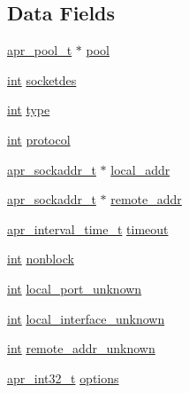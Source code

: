 \subsection*{Data Fields}
\begin{DoxyCompactItemize}
\item 
\hyperlink{structapr__pool__t}{apr\+\_\+pool\+\_\+t} $\ast$ \hyperlink{structapr__socket__t_a122d4e497509ed40dd450119a8aa1cd2}{pool}
\item 
\hyperlink{pcre_8txt_a42dfa4ff673c82d8efe7144098fbc198}{int} \hyperlink{structapr__socket__t_acd1a084790ce6cb462825fc029000095}{socketdes}
\item 
\hyperlink{pcre_8txt_a42dfa4ff673c82d8efe7144098fbc198}{int} \hyperlink{structapr__socket__t_a722ea4796e2227c8b0821d1d75ea0b07}{type}
\item 
\hyperlink{pcre_8txt_a42dfa4ff673c82d8efe7144098fbc198}{int} \hyperlink{structapr__socket__t_a89e0cf9d8e6d443c5d69d7f813ef9df7}{protocol}
\item 
\hyperlink{structapr__sockaddr__t}{apr\+\_\+sockaddr\+\_\+t} $\ast$ \hyperlink{structapr__socket__t_ae310bbeb00298cd45c03dca515289239}{local\+\_\+addr}
\item 
\hyperlink{structapr__sockaddr__t}{apr\+\_\+sockaddr\+\_\+t} $\ast$ \hyperlink{structapr__socket__t_a487dc49f378bdc6ad32d362b9fe575a2}{remote\+\_\+addr}
\item 
\hyperlink{group__apr__time_gaae2129185a395cc393f76fabf4f43e47}{apr\+\_\+interval\+\_\+time\+\_\+t} \hyperlink{structapr__socket__t_a3626689cdb39190d306a43cbd7f9e90c}{timeout}
\item 
\hyperlink{pcre_8txt_a42dfa4ff673c82d8efe7144098fbc198}{int} \hyperlink{structapr__socket__t_a737f257434cad45a1c44ad653f1e5964}{nonblock}
\item 
\hyperlink{pcre_8txt_a42dfa4ff673c82d8efe7144098fbc198}{int} \hyperlink{structapr__socket__t_a26fff6df2c70dd6cfa2514ca233cfbbf}{local\+\_\+port\+\_\+unknown}
\item 
\hyperlink{pcre_8txt_a42dfa4ff673c82d8efe7144098fbc198}{int} \hyperlink{structapr__socket__t_a3e468f713040ca13ba88d659b6e26fb5}{local\+\_\+interface\+\_\+unknown}
\item 
\hyperlink{pcre_8txt_a42dfa4ff673c82d8efe7144098fbc198}{int} \hyperlink{structapr__socket__t_ae9f799c8f438814bfbf0d66265d4ac0d}{remote\+\_\+addr\+\_\+unknown}
\item 
\hyperlink{group__apr__platform_ga21ef1e35fd3ff9be386f3cb20164ff02}{apr\+\_\+int32\+\_\+t} \hyperlink{structapr__socket__t_a84cff6f5374094c92de81474b88256bf}{options}

\end{DoxyCompactItemize}
